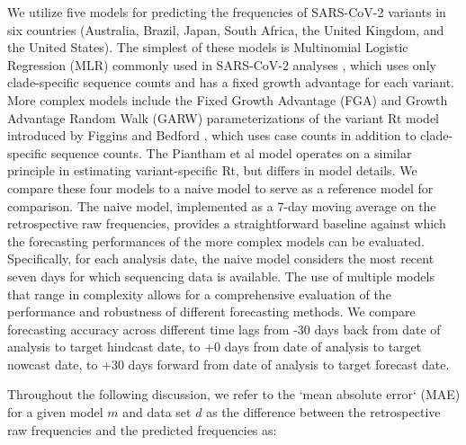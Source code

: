 \documentclass[11pt,oneside,letterpaper]{article}
\begin{document}
We utilize five models for predicting the frequencies of SARS-CoV-2 variants in six countries (Australia, Brazil, Japan, South Africa, the United Kingdom, and the United States).
The simplest of these models is Multinomial Logistic Regression (MLR) commonly used in SARS-CoV-2 analyses \cite{annavajhala2021emergence, faria2021genomics, obermeyer2022analysis}, which uses only clade-specific sequence counts and has a fixed growth advantage for each variant.
More complex models include the Fixed Growth Advantage (FGA) and Growth Advantage Random Walk (GARW) parameterizations of the variant Rt model introduced by Figgins and Bedford \cite{figgins2022sars}, which uses case counts in addition to clade-specific sequence counts.
The Piantham et al model \cite{piantham2021estimating} operates on a similar principle in estimating variant-specific Rt, but differs in model details.
We compare these four models to a naive model to serve as a reference model for comparison.
The naive model, implemented as a 7-day moving average on the retrospective raw frequencies, provides a straightforward baseline against which the forecasting performances of the more complex models can be evaluated. 
Specifically, for each analysis date, the naive model considers the most recent seven days for which sequencing data is available.
The use of multiple models that range in complexity allows for a comprehensive evaluation of the performance and robustness of different forecasting methods.
We compare forecasting accuracy across different time lags from -30 days back from date of analysis to target hindcast date, to +0 days from date of analysis to target nowcast date, to +30 days forward from date of analysis to target forecast date.


Throughout the following discussion, we refer to the `mean absolute error` (MAE) for a given model $m$ and data set $d$ as the difference between the retrospective raw frequencies and the predicted frequencies as:
\end{document}
